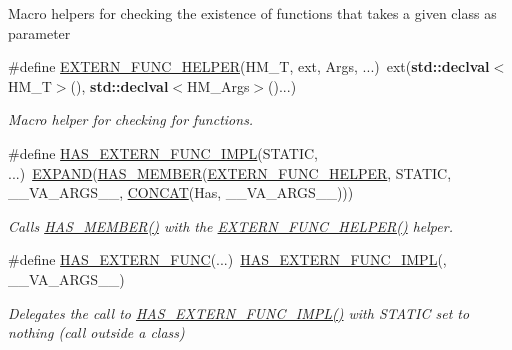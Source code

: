 Macro helpers for checking the existence of functions that takes a given class as parameter \begin{DoxyCompactItemize}
\item 
\#define \hyperlink{group__HasMemberGroup_gae37b488b307fefaafdfb8d7d584f42c7}{E\+X\+T\+E\+R\+N\+\_\+\+F\+U\+N\+C\+\_\+\+H\+E\+L\+P\+ER}(H\+M\+\_\+T,  ext,  Args, ...)~ext({\bf std\+::declval}$<$H\+M\+\_\+T$>$(), {\bf std\+::declval}$<$H\+M\+\_\+\+Args$>$()...)
\begin{DoxyCompactList}\small\item\em Macro helper for checking for functions. \end{DoxyCompactList}\item 
\#define \hyperlink{group__HasMemberGroup_ga92628c348fbdb72d41cc306d3b20f95a}{H\+A\+S\+\_\+\+E\+X\+T\+E\+R\+N\+\_\+\+F\+U\+N\+C\+\_\+\+I\+M\+PL}(S\+T\+A\+T\+IC, ...)~\hyperlink{ZipIter_2Helpers_8h_aa35fecfa6a93ec3fdb4a3776f873be27}{E\+X\+P\+A\+ND}(\hyperlink{group__HasMemberGroup_ga37993e5e75a0249077679e4776e89085}{H\+A\+S\+\_\+\+M\+E\+M\+B\+ER}(\hyperlink{group__HasMemberGroup_gae37b488b307fefaafdfb8d7d584f42c7}{E\+X\+T\+E\+R\+N\+\_\+\+F\+U\+N\+C\+\_\+\+H\+E\+L\+P\+ER}, S\+T\+A\+T\+IC, \+\_\+\+\_\+\+V\+A\+\_\+\+A\+R\+G\+S\+\_\+\+\_\+, \hyperlink{ZipIter_2Helpers_8h_a2f18db18bca26cafa95e9719de4a41ef}{C\+O\+N\+C\+AT}(Has, \+\_\+\+\_\+\+V\+A\+\_\+\+A\+R\+G\+S\+\_\+\+\_\+)))
\begin{DoxyCompactList}\small\item\em Calls \hyperlink{group__HasMemberGroup_ga37993e5e75a0249077679e4776e89085}{H\+A\+S\+\_\+\+M\+E\+M\+B\+E\+R()} with the \hyperlink{group__HasMemberGroup_gae37b488b307fefaafdfb8d7d584f42c7}{E\+X\+T\+E\+R\+N\+\_\+\+F\+U\+N\+C\+\_\+\+H\+E\+L\+P\+E\+R()} helper. \end{DoxyCompactList}\item 
\#define \hyperlink{group__HasMemberGroup_ga1fa642115f9d0f8b1a86b7ff313ae15f}{H\+A\+S\+\_\+\+E\+X\+T\+E\+R\+N\+\_\+\+F\+U\+NC}(...)~\hyperlink{group__HasMemberGroup_ga92628c348fbdb72d41cc306d3b20f95a}{H\+A\+S\+\_\+\+E\+X\+T\+E\+R\+N\+\_\+\+F\+U\+N\+C\+\_\+\+I\+M\+PL}(, \+\_\+\+\_\+\+V\+A\+\_\+\+A\+R\+G\+S\+\_\+\+\_\+)
\begin{DoxyCompactList}\small\item\em Delegates the call to \hyperlink{group__HasMemberGroup_ga92628c348fbdb72d41cc306d3b20f95a}{H\+A\+S\+\_\+\+E\+X\+T\+E\+R\+N\+\_\+\+F\+U\+N\+C\+\_\+\+I\+M\+P\+L()} with {\ttfamily S\+T\+A\+T\+IC} set to nothing (call outside a class) \end{DoxyCompactList}\item 

\end{DoxyCompactItemize}
